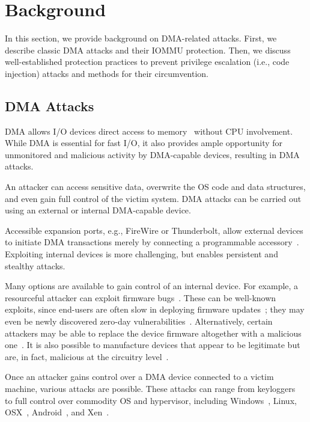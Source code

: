 \section{Background}\label{sec:background}

In this section, we provide background on DMA-related attacks. First, we describe classic DMA attacks and their IOMMU protection. Then, we discuss well-established protection practices to prevent privilege escalation (i.e., code injection) attacks and methods for their circumvention.

\subsection{DMA Attacks}

DMA allows I/O devices direct access to memory~\cite{oC54} without CPU involvement. While DMA is essential for fast I/O, it also provides ample opportunity for unmonitored and malicious activity by DMA-capable devices, resulting in DMA attacks. 

An attacker can access sensitive data, overwrite the OS code and data structures, and even gain full control of the victim system. DMA attacks can be carried out using an external or internal DMA-capable device. 

Accessible expansion ports, e.g., FireWire or Thunderbolt, allow external devices to initiate DMA transactions merely by connecting a programmable accessory~\cite{Dor04, Vol, MM, thunder}. 
Exploiting internal devices is more challenging, but enables persistent and stealthy attacks. 

Many options are available to gain control of an internal device.
For example, a resourceful attacker can exploit firmware bugs~\cite{SB12}. These can be well-known exploits, since end-users are often slow in deploying firmware updates~\cite{DPVL10}; they may even be newly discovered zero-day vulnerabilities~\cite{Ben17b}. Alternatively, certain attackers may be able to replace the device firmware altogether with a malicious one~\cite{ZKB13, NL14}. It is also possible to manufacture devices that appear to be legitimate but are, in fact, malicious at the circuitry level~\cite{YHD16}.

Once an attacker gains control over a DMA device connected to a victim machine, various attacks are possible. These attacks can range from keyloggers~\cite{LKV13, SB12} to full control over commodity OS and hypervisor, including Windows~\cite{AD10,thunder}, Linux, OSX~\cite{Fri16, thunder}, Android~\cite{Ben17b}, and Xen~\cite{Woj08}.

